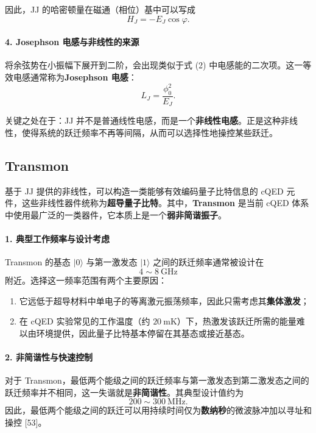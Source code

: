 \documentclass[12pt,a4paper,oneside]{ctexbook}
\begin{document}
因此，JJ 的哈密顿量在磁通（相位）基中可以写成
\begin{equation}
    H_J=-E_J\cos\varphi.
    \tag{12}
\end{equation}

\paragraph{4. Josephson 电感与非线性的来源}

将余弦势在小振幅下展开到二阶，会出现类似于式 (2) 中电感能的二次项。这一等效电感通常称为\textbf{Josephson 电感}：
\[
    L_J=\frac{\phi_0^2}{E_J}.
\]

关键之处在于：JJ 并不是普通线性电感，而是一个\textbf{非线性电感}。正是这种非线性，使得系统的跃迁频率不再等间隔，从而可以选择性地操控某些跃迁。

\subsection{Transmon}

基于 JJ 提供的非线性，可以构造一类能够有效编码量子比特信息的 cQED 元件，这些非线性器件统称为\textbf{超导量子比特}。其中，\textbf{Transmon} 是当前 cQED 体系中使用最广泛的一类器件，它本质上是一个\textbf{弱非简谐振子}。

\paragraph{1. 典型工作频率与设计考虑}

Transmon 的基态 \(\lvert 0\rangle\) 与第一激发态 \(\lvert 1\rangle\) 之间的跃迁频率通常被设计在
\[
    4\sim 8~\mathrm{GHz}
\]
附近。选择这一频率范围有两个主要原因：
\begin{enumerate}[leftmargin=2em]
    \item 它远低于超导材料中单电子的等离激元振荡频率，因此只需考虑其\textbf{集体激发}；
    \item 在 cQED 实验常见的工作温度（约 \(20~\mathrm{mK}\)）下，热激发该跃迁所需的能量难以由环境提供，因此量子比特基本停留在其基态或接近基态。
\end{enumerate}

\paragraph{2. 非简谐性与快速控制}

对于 Transmon，最低两个能级之间的跃迁频率与第一激发态到第二激发态之间的跃迁频率并不相同，这一失谐就是\textbf{非简谐性}。其典型设计值约为
\[
    200\sim 300~\mathrm{MHz}.
\]
因此，最低两个能级之间的跃迁可以用持续时间仅为\textbf{数纳秒}的微波脉冲加以寻址和操控 [53]。
\end{document}
